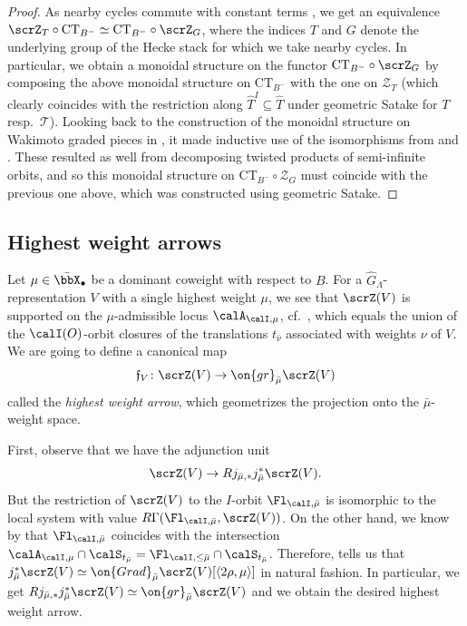 \documentclass[10pt, reqno]{amsart}
\theoremstyle{plain}
\theoremstyle{definition}
\numberwithin{equation}{section}
\begin{document}
\begin{proof}
		As nearby cycles commute with constant terms \cite[Proposition IV.6.12]{FS21}, we get an equivalence $\scrZ_T \circ \mathrm{CT}_{B^-}\simeq \mathrm{CT}_{B^-}\circ \scrZ_G$, where the indices $T$ and $G$ denote the underlying group of the Hecke stack for which we take nearby cycles. In particular, we obtain a monoidal structure on the functor $\mathrm{CT}_{B^-}\circ \scrZ_G$ by composing the above monoidal structure on $\mathrm{CT}_{B^-}$ with the one on $\mathscr{Z}_T$ (which clearly coincides with the restriction along $\hat{T}^I\subseteq \hat{T}$ under geometric Satake for $T$ resp.\ $\mathcal{T}$). Looking back to the construction of the monoidal structure on Wakimoto graded pieces in , it made inductive use of the isomorphisms from  and . These resulted as well from decomposing twisted products of semi-infinite orbits, and so this monoidal structure on $\mathrm{CT}_{B^-}\circ \mathscr{Z}_G$ must coincide with the previous one above, which was constructed using geometric Satake.		
	\end{proof}
	
	
	
	\subsection{Highest weight arrows}
	\label{sec:high-weight-arrows}
	Let $\mu\in \bar{\bbX}_\bullet$ be a dominant coweight with respect to $B$. For a $\hat{G}_\Lambda$-representation $V$ with a single highest weight $\mu$, we see that $\scrZ(V)$ is supported on the $\mu$-admissible locus $\calA_{\calI,\mu}$, cf.\ \cite[Theorem 6.16]{AGLR22}, which equals the union of the $\calI(O)$-orbit closures of the translations $t_{\bar \nu}$ associated with weights $\nu$ of $V$. We are going to define a canonical map
	\begin{equation}
		\mathfrak{f}_{V}\colon \scrZ(V) \to \on{gr}_{\bar \mu} \scrZ(V)
	\end{equation}
	called the \textit{highest weight arrow}, which geometrizes the projection onto the $\bar{\mu}$-weight space.
	
	
	First, observe that we have the adjunction unit \begin{equation}\scrZ(V) \to Rj_{\bar \mu,*}j_{\bar \mu}^* \scrZ(V).\end{equation} But the restriction of $\scrZ(V)$ to the $I$-orbit $\Fl_{\calI, \bar \mu}$ is isomorphic to the local system with value 
	$R\Gamma(\Fl_{\calI,\bar \mu},\scrZ(V))$. 
	On the other hand, we know by  that $\Fl_{\calI,\bar \mu}$ coincides with the intersection $\calA_{\calI,\mu}\cap \calS_{t_{\bar\mu}}=\Fl_{\calI,\leq \bar\mu}\cap \calS_{t_{\bar\mu}}$. Therefore,  tells us that $j^*_{\bar \mu} \scrZ(V)\simeq \on{Grad}_{\bar \mu} \scrZ(V)[\langle 2\rho, \mu \rangle]$ 
	in natural fashion. In particular, we get $Rj_{\bar \mu,*}j^*_{\bar \mu} \scrZ(V)\simeq \on{gr}_{\bar \mu} \scrZ(V)$ and we obtain the desired highest weight arrow.
	
\end{document}
